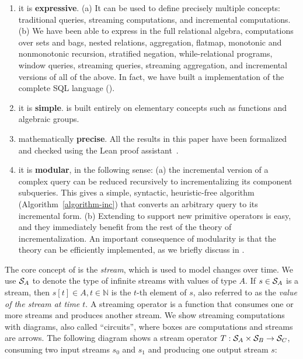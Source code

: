 \begin{enumerate}[nosep, leftmargin=0pt, itemindent=0.5cm, label=\textbf{(\arabic{*})}]
\item it is \textbf{expressive}.  (a) It can be used to define
precisely multiple concepts: traditional queries, streaming computations, and incremental
computations.  (b) We have been able to express in \dbsp the full
relational algebra, computations over sets and bags,
nested relations, aggregation, flatmap, monotonic and nonmonotonic 
recursion, stratified negation, while-relational programs, window queries, 
streaming queries, streaming aggregation, and incremental versions of all
of the above.  In fact, we have built a \dbsp implementation of the 
complete SQL language ().
\item it is \textbf{simple}.
\dbsp is built entirely on elementary concepts such as functions and algebraic groups.
\item mathematically \textbf{precise}.  All the results in this paper have been
formalized and checked using the Lean 
proof assistant~\cite{moura-cade15}. 
\item it is \textbf{modular}, in the following sense:
(a) the incremental version of a complex query can be reduced
recursively to incrementalizing its component subqueries.
This gives a simple, syntactic,
heuristic-free algorithm (Algorithm~\ref{algorithm-inc}) 
that converts an arbitrary \dbsp query to its incremental form.
(b) Extending \dbsp to support new primitive operators is easy,
and they immediately benefit from the rest of the theory of
incrementalization.
An important consequence of modularity is that the theory
can be efficiently implemented, as we 
briefly discuss in .  
\end{enumerate}



The core concept of \dbsp is the \emph{stream}, which is used to model changes
over time. We use $\mathcal{S}_{A}$ to denote the type of infinite streams with values of 
type $A$. If $s \in \mathcal{S}_{A}$ is a stream, 
then $s[t] \in A, t \in \mathbb{N}$ is the $t$-th element of $s$, also referred to as the \emph{value of the stream at time $t$}.
A streaming operator is a function that
consumes one or more streams and produces another stream.  We show
streaming computations with diagrams, also called ``circuits'',
where boxes are computations and streams are arrows.  The following diagram
shows a stream operator $T: \mathcal{S}_{A} \times \mathcal{S}_{B} \to \mathcal{S}_{C}$,
consuming two input streams $s_0$ and $s_1$ 
and producing one output stream $s$:

